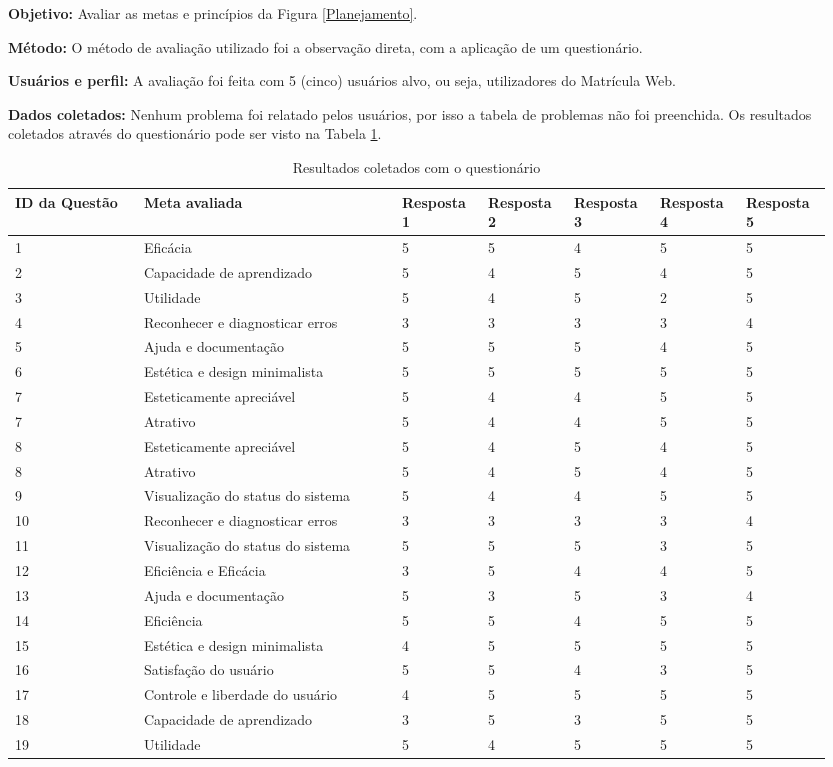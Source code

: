   \textbf{Objetivo:}
  Avaliar as metas e princípios da Figura \ref{Planejamento}.

  \textbf{Método:}
  O método de avaliação utilizado foi a observação direta, com a aplicação de um questionário.

  \textbf{Usuários e perfil:}
  A avaliação foi feita com 5 (cinco) usuários alvo, ou seja, utilizadores do Matrícula Web.

  \textbf{Dados coletados:}
     Nenhum problema foi relatado pelos usuários, por isso a tabela de problemas não foi preenchida. Os resultados coletados
   através do questionário pode ser visto na Tabela \ref{tab:resultados2}.
   
\begin{table}[!h]
  \caption{Resultados coletados com o questionário}
  \label{tab:resultados2}
    \begin{tabular}{p{0.15\linewidth}p{0.30\linewidth}p{0.10\linewidth}p{0.10\linewidth}p{0.10\linewidth}p{0.10\linewidth}p{0.10\linewidth}}
  \hline
    ID da Questão & Meta avaliada & Resposta 1 & Resposta 2 & Resposta 3 & Resposta 4 & Resposta 5\\
  \hline
    1&Eficácia &5&5&4&5&5\\
     2&Capacidade de aprendizado &5&4&5&4&5\\
      3&Utilidade&5&4&5&2&5\\
      4&Reconhecer e diagnosticar erros&3&3&3&3&4\\
      5&Ajuda e documentação&5&5&5&4&5\\
      6&Estética e design minimalista&5&5&5&5&5\\
      7&Esteticamente apreciável&5&4&4&5&5\\
      7&Atrativo&5&4&4&5&5\\
       8&Esteticamente apreciável &5&4&5&4&5\\
        8&Atrativo&5&4&5&4&5\\
     9&Visualização do status do sistema &5&4&4&5&5\\
      10&Reconhecer e diagnosticar erros &3&3&3&3&4\\
      11&Visualização do status do sistema &5&5&5&3&5\\
      12&Eficiência e Eficácia &3&5&4&4&5\\
      13&Ajuda e documentação&5&3&5&3&4\\
      14&Eficiência&5&5&4&5&5\\
      15&Estética e design minimalista&4&5&5&5&5\\
      16&Satisfação do usuário&5&5&4&3&5\\
      17&Controle e liberdade do usuário&4&5&5&5&5\\
      18&Capacidade de aprendizado&3&5&3&5&5\\
      19&Utilidade&5&4&5&5&5\\

  \end{tabular}
\end{table}

